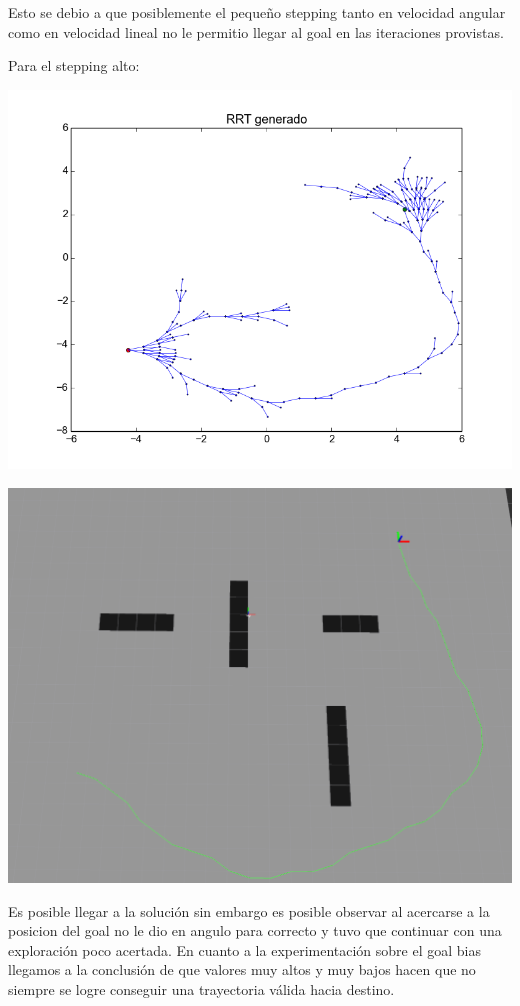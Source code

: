 Esto se debio a que posiblemente el pequeño stepping tanto en velocidad angular como en velocidad lineal no le permitio llegar al goal en las iteraciones provistas.

Para el stepping alto:

\includegraphics[scale=0.5]{velocidad/stepping_alto2.png}

\includegraphics[scale=0.3]{velocidad/stepping_alto_rviz2.png}

Es posible llegar a la solución sin embargo es posible observar al acercarse a la posicion del goal no le dio en angulo para correcto y tuvo que continuar con una exploración poco acertada.
%
%
%
En cuanto a la experimentación sobre el goal bias llegamos a la conclusión de que valores muy altos y muy bajos hacen que no siempre se logre conseguir una trayectoria válida hacia destino.


